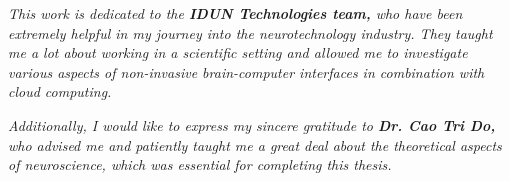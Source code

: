 \begin{dedication}

    \textit{This work is dedicated to the \textbf{IDUN Technologies team,} who have been extremely helpful in my journey into the neurotechnology industry. They taught me a lot about working in a scientific setting and allowed me to investigate various aspects of non-invasive brain-\break computer interfaces in combination with cloud computing.}

    \hfill \break

    \textit{Additionally, I would like to express my sincere gratitude to \textbf{Dr. Cao Tri Do,} who advised me and patiently taught me a great deal about the theoretical aspects of neuroscience, \break which was essential for completing this thesis.}

\end{dedication}
